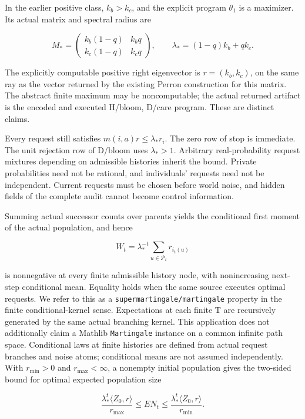 \documentclass[
  english,
  11pt,
  oneside]{book}
\newcounter{none} %
\begin{document}
In the earlier positive class, \(k_b>k_c\), and the explicit program \(\theta_1\) is a maximizer. Its actual matrix and spectral radius are

\[M_* = \begin{pmatrix}k_b(1-q)&k_bq\\k_c(1-q)&k_cq\end{pmatrix},\qquad
\lambda_*=(1-q)k_b+qk_c.\]

The explicitly computable positive right eigenvector is \(r=(k_b,k_c)\), on the same ray as the vector returned by the existing Perron construction for this matrix. The abstract finite maximum may be noncomputable; the actual returned artifact is the encoded and executed H/bloom, D/care program. These are distinct claims.

Every request still satisfies \(m(i,a)r\le\lambda_*r_i\). The zero row of stop is immediate. The unit rejection row of D/bloom uses \(\lambda_*>1\). Arbitrary real-probability request mixtures depending on admissible histories inherit the bound. Private probabilities need not be rational, and individuals' requests need not be independent. Current requests must be chosen before world noise, and hidden fields of the complete audit cannot become control information.

Summing actual successor counts over parents yields the conditional first moment of the actual population, and hence

\[W_t=\lambda_*^{-t}\sum_{u\in\mathcal P_t}r_{i_t(u)}\]

is nonnegative at every finite admissible history node, with nonincreasing next-step conditional mean. Equality holds when the same source executes optimal requests. We refer to this as a \nolinkurl{supermartingale/martingale} property in the finite conditional-kernel sense. Expectations at each finite T are recursively generated by the same actual branching kernel. This application does not additionally claim a Mathlib \texttt{Martingale} instance on a common infinite path space. Conditional laws at finite histories are defined from actual request branches and noise atoms; conditional means are not assumed independently. With \(r_{\min}>0\) and \(r_{\max}<\infty\), a nonempty initial population gives the two-sided bound for optimal expected population size

\[\frac{\lambda_*^t\langle Z_0,r\rangle}{r_{\max}}
\le E N_t\le
\frac{\lambda_*^t\langle Z_0,r\rangle}{r_{\min}}.\]
\end{document}
